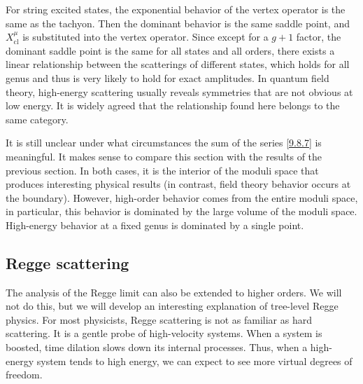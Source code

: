 For string excited states, the exponential behavior of the vertex operator is the same as the tachyon. Then the dominant behavior is the same saddle point, and $X_{\mathrm{cl}}^{\mu}$ is substituted into the vertex operator.
Since except for a $g+1$ factor, the dominant saddle point is the same for all states and all orders, there exists a linear relationship between the scatterings of different states, which holds for all genus and thus is very likely to hold for exact amplitudes. 
In quantum field theory, high-energy scattering usually reveals symmetries that are not obvious at low energy. It is widely agreed that the relationship found here belongs to the same category.

It is still unclear under what circumstances the sum of the series \eqref{9.8.7} is meaningful. It makes sense to compare this section with the results of the previous section. 
In both cases, it is the interior of the moduli space that produces interesting physical results (in contrast, field theory behavior occurs at the boundary). 
However, high-order behavior comes from the entire moduli space, in particular, this behavior is dominated by the large volume of the moduli space. High-energy behavior at a fixed genus is dominated by a single point.

\subsection*{Regge scattering}

The analysis of the Regge limit can also be extended to higher orders. We will not do this, but we will develop an interesting explanation of tree-level Regge physics.
For most physicists, Regge scattering is not as familiar as hard scattering. It is a gentle probe of high-velocity systems. 
When a system is boosted, time dilation slows down its internal processes. Thus, when a high-energy system tends to high energy, we can expect to see more virtual degrees of freedom.

